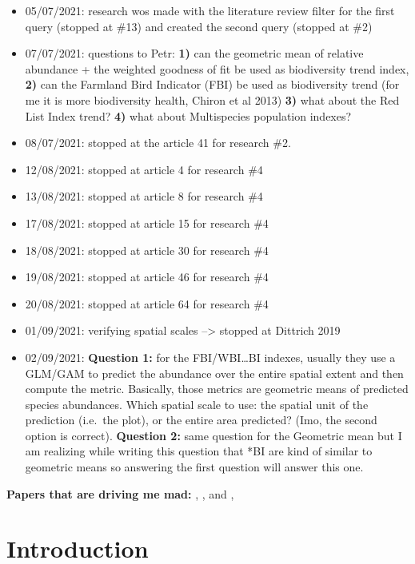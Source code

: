 \documentclass[
  12pt,
  oneside]{report}
\begin{document}
\begin{itemize}
\item
  05/07/2021: research wos made with the literature review filter for the first query (stopped at \#13) and created the second query (stopped at \#2)
\item
  07/07/2021: questions to Petr: \textbf{1)} can the geometric mean of relative abundance + the weighted goodness of fit be used as biodiversity trend index, \textbf{2)} can the Farmland Bird Indicator (FBI) be used as biodiversity trend (for me it is more biodiversity health, Chiron et al 2013) \textbf{3)} what about the Red List Index trend? \textbf{4)} what about Multispecies population indexes?
\item
  08/07/2021: stopped at the article 41 for research \#2.
\item
  12/08/2021: stopped at article 4 for research \#4
\item
  13/08/2021: stopped at article 8 for research \#4
\item
  17/08/2021: stopped at article 15 for research \#4
\item
  18/08/2021: stopped at article 30 for research \#4
\item
  19/08/2021: stopped at article 46 for research \#4
\item
  20/08/2021: stopped at article 64 for research \#4
\item
  01/09/2021: verifying spatial scales --\textgreater{} stopped at Dittrich 2019
\item
  02/09/2021: \textbf{Question 1:} for the FBI/WBI\ldots*BI indexes, usually they use a GLM/GAM to predict the abundance over the entire spatial extent and then compute the metric. Basically, those metrics are geometric means of predicted species abundances. Which spatial scale to use: the spatial unit of the prediction (i.e.~the plot), or the entire area predicted? (Imo, the second option is correct). \textbf{Question 2:} same question for the Geometric mean but I am realizing while writing this question that *BI are kind of similar to geometric means so answering the first question will answer this one.
\end{itemize}

\textbf{Papers that are driving me mad:} \citet{doxa_low-intensity_2010}, \citet{jiguet_french_2012}, and \citet{chiron_forecasting_2013}, \citet{eglington_disentangling_2012}

\hypertarget{introduction}{%
\chapter{Introduction}\label{introduction}}
\end{document}
